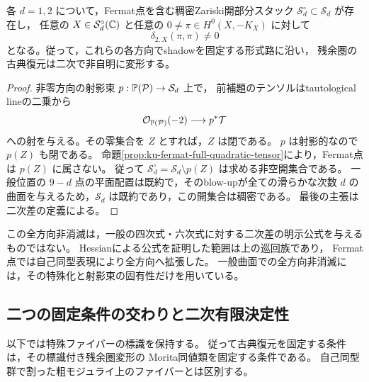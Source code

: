 \begin{corollary}[一般曲面の全Poisson方向での二次非消滅]
\label{cor:ku-generic-all-directions-quadratic}
各 $d=1,2$ について，Fermat点を含む稠密Zariski開部分スタック
$\mathcal S_d^\circ\subset\mathcal S_d$ が存在し，
任意の $X\in\mathcal S_d^\circ(\mathbb C)$ と任意の
$0\ne\pi\in H^0(X,-K_X)$ に対して
\[
 \delta_{2,X}(\pi,\pi)\ne0
\]
となる。従って，これらの各方向でshadowを固定する形式路に沿い，
残余圏の古典復元は二次で非自明に変形する。
\end{corollary}
\begin{proof}
非零方向の射影束 $p:\mathbb P(\mathcal P)\to\mathcal S_d$ 上で，
前補題のテンソルはtautological lineの二乗から
\[
 \mathcal O_{\mathbb P(\mathcal P)}(-2)\longrightarrow p^*\mathcal T
\]
への射を与える。その零集合を $Z$ とすれば，$Z$ は閉である。
$p$ は射影的なので $p(Z)$ も閉である。
命題\ref{prop:ku-fermat-full-quadratic-tensor}により，Fermat点は $p(Z)$ に属さない。
従って $\mathcal S_d^\circ=\mathcal S_d\setminus p(Z)$ は求める非空開集合である。
一般位置の $9-d$ 点の平面配置は既約で，そのblow-upが全ての滑らかな次数 $d$ の
曲面を与えるため，$\mathcal S_d$ は既約であり，この開集合は稠密である。
最後の主張は二次差の定義による。
\end{proof}

\begin{remark}
この全方向非消滅は，一般の四次式・六次式に対する二次差の明示公式を与えるものではない。
Hessianによる公式を証明した範囲は上の巡回族であり，
Fermat点では自己同型表現により全方向へ拡張した。
一般曲面での全方向非消滅には，その特殊化と射影束の固有性だけを用いている。
\end{remark}

\subsection{二つの固定条件の交わりと二次有限決定性}

以下では特殊ファイバーの標識を保持する。
従って古典復元を固定する条件は，その標識付き残余圏変形の
Morita同値類を固定する条件である。
自己同型群で割った粗モジュライ上のファイバーとは区別する。

